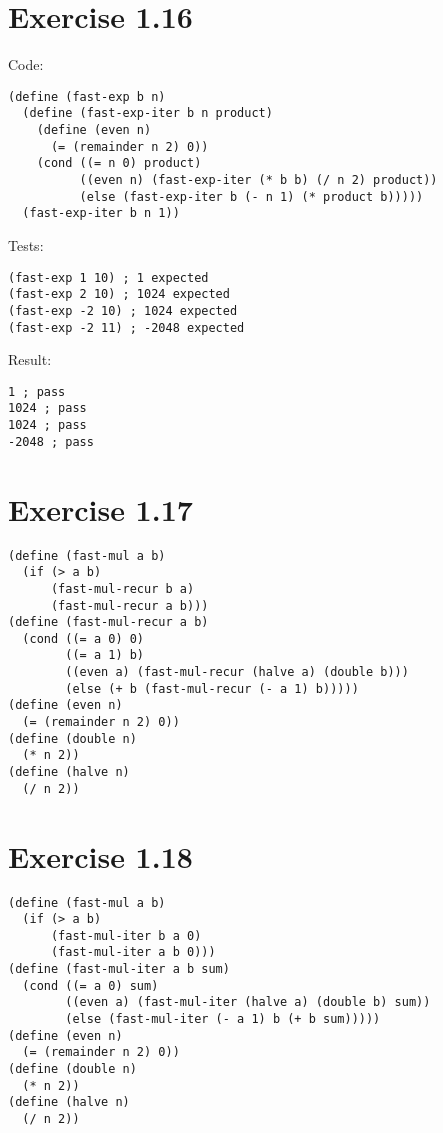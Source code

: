 \documentclass[../main.tex]{subfiles}
\begin{document}
\section{Exercise 1.16}

Code:

\begin{lstlisting}
(define (fast-exp b n)
  (define (fast-exp-iter b n product)
    (define (even n)
      (= (remainder n 2) 0))
    (cond ((= n 0) product)
          ((even n) (fast-exp-iter (* b b) (/ n 2) product))
          (else (fast-exp-iter b (- n 1) (* product b)))))
  (fast-exp-iter b n 1))
\end{lstlisting}

Tests:

\begin{lstlisting}
(fast-exp 1 10) ; 1 expected
(fast-exp 2 10) ; 1024 expected
(fast-exp -2 10) ; 1024 expected
(fast-exp -2 11) ; -2048 expected
\end{lstlisting}

Result:

\begin{lstlisting}
1 ; pass
1024 ; pass
1024 ; pass
-2048 ; pass
\end{lstlisting}

\section{Exercise 1.17}

\begin{lstlisting}
(define (fast-mul a b)
  (if (> a b)
      (fast-mul-recur b a)
      (fast-mul-recur a b)))
(define (fast-mul-recur a b)
  (cond ((= a 0) 0)
        ((= a 1) b)
        ((even a) (fast-mul-recur (halve a) (double b)))
        (else (+ b (fast-mul-recur (- a 1) b)))))
(define (even n)
  (= (remainder n 2) 0))
(define (double n)
  (* n 2))
(define (halve n)
  (/ n 2))
\end{lstlisting}

\section{Exercise 1.18}

\begin{lstlisting}
(define (fast-mul a b)
  (if (> a b)
      (fast-mul-iter b a 0)
      (fast-mul-iter a b 0)))
(define (fast-mul-iter a b sum)
  (cond ((= a 0) sum)
        ((even a) (fast-mul-iter (halve a) (double b) sum))
        (else (fast-mul-iter (- a 1) b (+ b sum)))))
(define (even n)
  (= (remainder n 2) 0))
(define (double n)
  (* n 2))
(define (halve n)
  (/ n 2))
\end{lstlisting}
\end{document}
